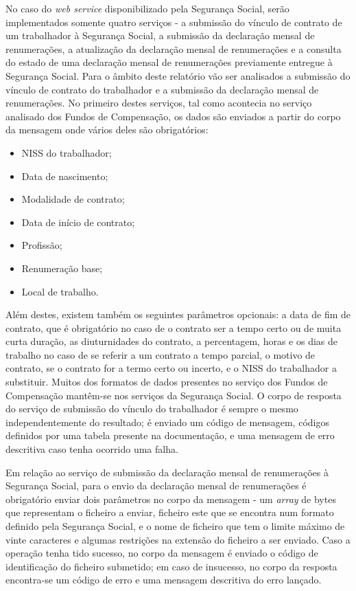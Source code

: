 \documentclass[sigplan]{acmart}
\begin{document}
No caso do \textit{web service} disponibilizado pela Segurança Social, serão implementados somente quatro serviços - a submissão do vínculo de contrato de um trabalhador à Segurança Social, a submissão da declaração mensal de renumerações, a atualização da declaração mensal de renumerações e a consulta do estado de uma declaração mensal de renumerações previamente entregue à Segurança Social. Para o âmbito deste relatório vão ser analisados a submissão do vínculo de contrato do trabalhador e a submissão da declaração mensal de renumerações. No primeiro destes serviços, tal como acontecia no serviço analisado dos Fundos de Compensação, os dados são enviados a partir do corpo da mensagem onde vários deles são obrigatórios:
\begin{itemize}
  \item NISS do trabalhador;
  \item Data de nascimento;
  \item Modalidade de contrato;
  \item Data de início de contrato;
  \item Profissão;
  \item Renumeração base;
  \item Local de trabalho.
\end{itemize}
Além destes, existem também os seguintes parâmetros opcionais: a data de fim de contrato, que é obrigatório no caso de o contrato ser a tempo certo ou de muita curta duração, as diuturnidades do contrato, a percentagem, horas e os dias de trabalho no caso de se referir a um contrato a tempo parcial, o motivo de contrato, se o contrato for a termo certo ou incerto, e o NISS do trabalhador a substituir. Muitos dos formatos de dados presentes no serviço dos Fundos de Compensação mantêm-se nos serviços da Segurança Social. O corpo de resposta do serviço de submissão do vínculo do trabalhador é sempre o mesmo independentemente do resultado; é enviado um código de mensagem, códigos definidos por uma tabela presente na documentação, e uma mensagem de erro descritiva caso tenha ocorrido uma falha.

Em relação ao serviço de submissão da declaração mensal de renumerações à Segurança Social, para o envio da declaração mensal de renumerações é obrigatório enviar dois parâmetros no corpo da mensagem - um \textit{array} de bytes que representam o ficheiro a enviar, ficheiro este que se encontra num formato definido pela Segurança Social, e o nome de ficheiro que tem o limite máximo de vinte caracteres e algumas restrições na extensão do ficheiro a ser enviado. Caso a operação tenha tido sucesso, no corpo da mensagem é enviado o código de identificação do ficheiro submetido; em caso de insucesso, no corpo da resposta encontra-se um código de erro e uma mensagem descritiva do erro lançado.
\end{document}
